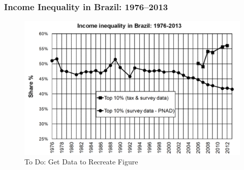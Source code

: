 \documentclass[t]{beamer}\usepackage[]{graphicx}\usepackage[]{color}
\begin{document}
\begin{frame}[label=BrazilInequality]
\frametitle{Income Inequality in Brazil: 1976--2013}
\begin{figure}[t]
\begin{minipage}[b]{\textwidth}
\centering
\includegraphics[width=\textwidth]
{pictures/IncomeInequalityBrazil}
\caption{To Do: Get Data to Recreate Figure}
\end{minipage}
\end{figure}
\end{frame}


\end{document}
